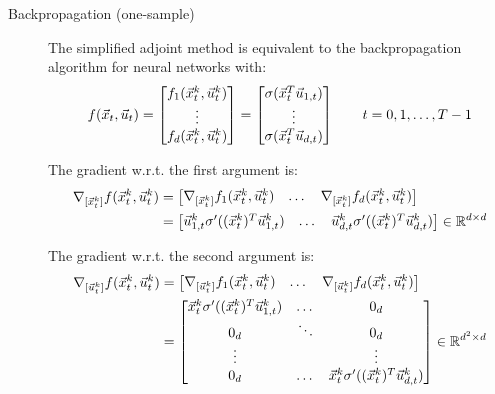 \begin{description}
    \item[Backpropagation (one-sample)] 
        The simplified adjoint method is equivalent to the backpropagation algorithm for neural networks with:
        \[
            f({\vec{x}}_t, {\vec{u}}_t) = 
            \begin{bmatrix}
                f_1({\vec{x}}_t^k, {\vec{u}}_t^k) \\ \vdots \\ f_d({\vec{x}}_t^k, {\vec{u}}_t^k)
            \end{bmatrix} = 
            \begin{bmatrix}
                \sigma({\vec{x}}_t^T {\vec{u}}_{1,t}) \\ \vdots \\ \sigma({\vec{x}}_t^T {\vec{u}}_{d,t})
            \end{bmatrix}
            \qquad
            t = 0, 1, \dots, T-1
        \]

        The gradient w.r.t. the first argument is:
        \[
            \begin{split}
                \nabla_{[{\vec{x}}_t^k]} f({\vec{x}}_t^k, {\vec{u}}_t^k) 
                &= \begin{bmatrix}
                    \nabla_{[{\vec{x}}_t^k]} f_1({\vec{x}}_t^k, {\vec{u}}_t^k) & \dots & \nabla_{[{\vec{x}}_t^k]} f_d({\vec{x}}_t^k, {\vec{u}}_t^k)
                \end{bmatrix} \\
                &= \begin{bmatrix}
                    {\vec{u}}_{1,t}^k \sigma'(({\vec{x}}_t^k)^T {\vec{u}}_{1,t}^k) & \dots & {\vec{u}}_{d,t}^k \sigma'(({\vec{x}}_t^k)^T {\vec{u}}_{d,t}^k)
                \end{bmatrix} \in \mathbb{R}^{d \times d}
            \end{split}
        \]
            
        The gradient w.r.t. the second argument is:
        \[
            \begin{split}
                \nabla_{[{\vec{u}}_t^k]} f({\vec{x}}_t^k, {\vec{u}}_t^k) 
                &= \begin{bmatrix}
                    \nabla_{[{\vec{u}}_t^k]} f_1({\vec{x}}_t^k, {\vec{u}}_t^k) & \dots & \nabla_{[{\vec{u}}_t^k]} f_d({\vec{x}}_t^k, {\vec{u}}_t^k)
                \end{bmatrix} \\
                &= \begin{bmatrix}
                    {\vec{x}}_t^k \sigma'(({\vec{x}}_t^k)^T {\vec{u}}_{1,t}^k) & \dots & 0_d \\
                    0_d & \ddots & 0_d \\
                    \vdots & &  \vdots \\
                    0_d & \dots & {\vec{x}}_t^k \sigma'(({\vec{x}}_t^k)^T {\vec{u}}_{d,t}^k)
                \end{bmatrix} \in \mathbb{R}^{d^2 \times d}
            \end{split}
        \]


\end{description}
